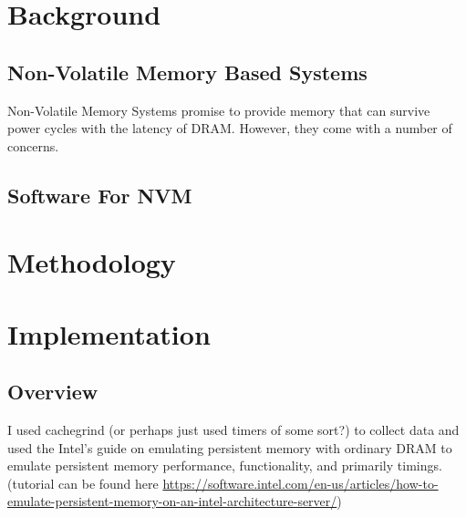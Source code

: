 \documentclass[twocolumn]{article}
\begin{document}
\section{Background}

\subsection{Non-Volatile Memory Based Systems}

Non-Volatile Memory Systems promise to provide memory that can survive power
cycles with the latency of DRAM. 
However, they come with a number of concerns.

\subsection{Software For NVM}


\section{Methodology}


\section{Implementation}

\subsection{Overview}



I used cachegrind (or perhaps just used timers of some sort?) to collect data
and used the Intel's guide on emulating persistent memory with ordinary DRAM to
emulate persistent memory performance, functionality, and primarily timings.
(tutorial can be found here
\url{https://software.intel.com/en-us/articles/how-to-emulate-persistent-memory-on-an-intel-architecture-server/})
\end{document}
